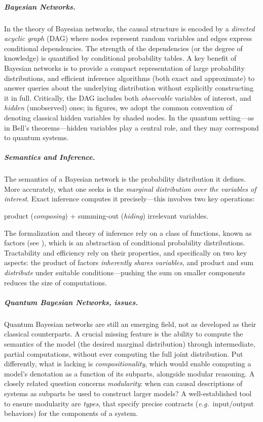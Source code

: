 \documentclass[10pt,a4paper]{article}
\newcommand*{\eg}{\emph{e.g.}\xspace}
\begin{document}
\subparagraph{Bayesian Networks.}

In the theory of Bayesian networks, the causal structure is encoded by a \emph{directed acyclic graph} (DAG) where nodes represent random variables and edges express conditional dependencies.
The strength of the dependencies (or the degree of knowledge) is quantified by conditional probability tables.
A key benefit of Bayesian networks is to provide a compact representation of large probability distributions, and efficient inference algorithms (both exact and approximate) to answer queries about the underlying distribution without explicitly constructing it in full.
Critically, the DAG includes both \emph{observable} variables of interest, and \emph{hidden} (unobserved) ones; in figures, we adopt the common convention of denoting classical hidden variables by shaded nodes. In the quantum setting---as in Bell's theorems---hidden variables play a central role, and they may correspond to quantum systems.

\subparagraph{Semantics and Inference.}

The semantics of a Bayesian network is the probability distribution it defines.
More accurately, what one seeks is the \emph{marginal distribution over the variables of interest}.
Exact inference computes it precisely---this involves two key operations:

{\hfill
	product (\emph{composing}) 
	+ summing-out (\emph{hiding}) irrelevant variables.
\hfill}

The formalization and theory of inference rely on a class of functions, known as factors (see ), which is an abstraction of conditional probability distributions.
Tractability and efficiency rely on their properties, and specifically on two key aspects: the product of factors \emph{inherently shares variables}, and product and sum \emph{distribute} under suitable conditions---pushing the sum on smaller components reduces the size of computations.

\subparagraph{Quantum Bayesian Networks, issues.}

Quantum Bayesian networks are still an emerging field, not as developed as their classical counterparts.
A crucial missing feature is the ability to compute the semantics of the model (the desired marginal distribution) through intermediate, partial computations, without ever computing the full joint distribution.
Put differently, what is lacking is \emph{compositionality}, which would enable computing a model's denotation as a function of its subparts, alongside modular reasoning.
A closely related question concerns \emph{modularity}: when can causal descriptions of systems as subparts be used to construct larger models?
A well-established tool to ensure modularity are \emph{types}, that specify precise contracts (\eg\ input/output behaviors) for the components of a system. 
\end{document}
